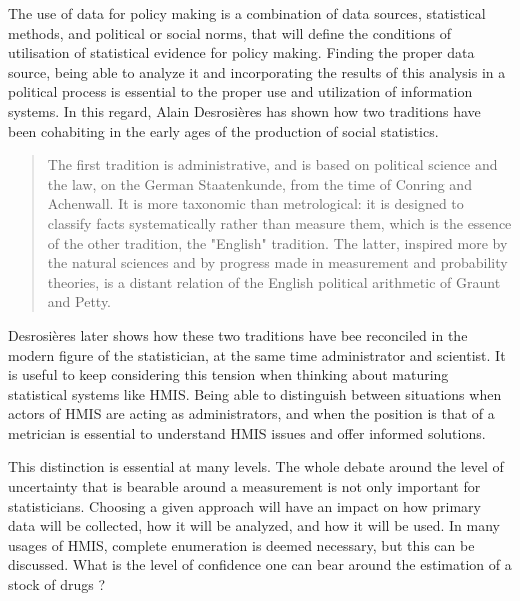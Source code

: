 The use of data for policy making is a combination of data sources, statistical methods, and political or social norms, that will define the conditions of utilisation of statistical evidence for policy making. Finding the proper data source, being able to analyze it and incorporating the results of this analysis in a political process is essential to the proper use and utilization of information systems. In this regard, Alain Desrosières has shown how two traditions have been cohabiting in the early ages of the production of social statistics\cite{admin_savant}.



\begin{quote}
	The first tradition is administrative, and is based on political science and the law, on the German Staatenkunde, from the time of Conring and Achenwall. It is more taxonomic than metrological: it is designed to classify facts systematically rather than measure them, which is the essence of the other tradition, the "English" tradition. The latter, inspired more by the natural sciences and by progress made in measurement and probability theories, is a distant relation of the English political arithmetic of Graunt and Petty.
\end{quote}

Desrosières later shows how these two traditions have bee reconciled in the modern figure of the statistician, at the same time administrator and scientist. It is useful to keep considering this tension when thinking about maturing statistical systems like HMIS. Being able to distinguish between situations when actors of HMIS are acting as administrators, and when the position is that of a metrician is essential to understand HMIS issues and offer informed solutions.

This distinction is essential at many levels. The whole debate around the level of uncertainty that is bearable around a measurement is not only important for statisticians. Choosing a given approach will have an impact on how primary data will be collected, how it will be analyzed, and how it will be used. In many usages of HMIS, complete enumeration is deemed necessary, but this can be discussed. What is the level of confidence one can bear around the estimation of a stock of drugs ?


